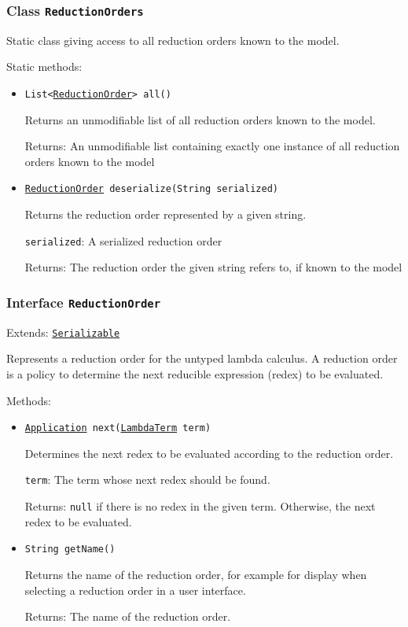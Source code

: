 \subsubsection{Class \texttt{ReductionOrders}}
\label{type:edu.kit.wavelength.client.model.reduction.ReductionOrders}
Static class giving access to all reduction orders known to the model.

Static methods:
\begin{itemize}
\item \texttt{List<\hyperref[type:edu.kit.wavelength.client.model.reduction.ReductionOrder]{ReductionOrder}> all()}

Returns an unmodifiable list of all reduction orders known to the model.

Returns: An unmodifiable list containing exactly one instance of all
 reduction orders known to the model

\item \texttt{\hyperref[type:edu.kit.wavelength.client.model.reduction.ReductionOrder]{ReductionOrder} deserialize(String serialized)}

Returns the reduction order represented by a given string.

\texttt{serialized}: A serialized reduction order

Returns: The reduction order the given string refers to, if known to the model

\end{itemize}

\subsubsection{Interface \texttt{ReductionOrder}}
\label{type:edu.kit.wavelength.client.model.reduction.ReductionOrder}
Extends: \texttt{\hyperref[type:edu.kit.wavelength.client.model.serialization.Serializable]{Serializable}}

Represents a reduction order for the untyped lambda calculus. A reduction
 order is a policy to determine the next reducible expression (redex) to be evaluated.

Methods:
\begin{itemize}
\item \texttt{\hyperref[type:edu.kit.wavelength.client.model.term.Application]{Application} next(\hyperref[type:edu.kit.wavelength.client.model.term.LambdaTerm]{LambdaTerm} term)}

Determines the next redex to be evaluated according to the reduction order.

\texttt{term}: The term whose next redex should be found.

Returns: \texttt{null} if there is no redex in the given term. Otherwise,
 the next redex to be evaluated.

\item \texttt{String getName()}

Returns the name of the reduction order, for example for display when
 selecting a reduction order in a user interface.

Returns: The name of the reduction order.

\end{itemize}

